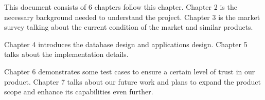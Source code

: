 This document consists of 6 chapters follow this chapter. Chapter 2 is the necessary background needed to understand the project. Chapter 3 is the market survey talking about the current condition of the market and similar products. 

Chapter 4 introduces the database design and applications design. Chapter 5 talks about the implementation details. 

Chapter 6 demonstrates some test cases to ensure a certain level of trust in our product. Chapter 7 talks about our future work and plans to expand the product scope and enhance its capabilities even further.